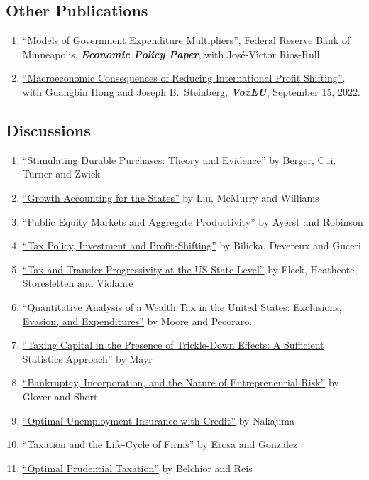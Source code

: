\documentclass[letterpaper]{article}
\begin{document}
\subsection*{Other Publications}
\begin{enumerate}[resume]
\item \href{https://www.minneapolisfed.org/~/media/files/pubs/eppapers/12-2/eppaper12-2_models.pdf}{``Models of Government Expenditure Multipliers''}, Federal Reserve Bank of Minneapolis, \textbf{\emph{Economic Policy Paper}}, with Jos\'e-V\'{\i}ctor R\'{\i}os-Rull.
\item \href{https://cepr.org/voxeu/columns/macroeconomic-consequences-reducing-international-profit-shifting}{``Macroeconomic Consequences of Reducing International Profit Shifting''}, with Guangbin Hong and Joseph B.\ Steinberg, \textbf{\emph{VoxEU}}, September 15, 2022.
\end{enumerate}

\subsection*{Discussions}
\begin{enumerate}
\item \href{https://www.dyrda.info/files/NTA_discussion_Dyrda.pdf}{``Stimulating Durable Purchases: Theory and Evidence''} by Berger, Cui, Turner and Zwick
\item \href{https://dyrda.info/files/Dyrda_VMC_discussion.pdf}{``Growth Accounting for the States''} by Liu, McMurry and Williams
\item \href{https://dyrda.info/files/CMSG23_discussion.pdf}{``Public Equity Markets and Aggregate Productivity''} by Ayerst and Robinson
\item \href{https://dyrda.info/files/Bilicka_Devereux_Guceri_IIPF2023_discussion.pdf}{``Tax Policy, Investment and Profit-Shifting''} by Bilicka, Devereux and Guceri
\item \href{https://dyrda.info/files/NTA_discussion_FHSV.pdf}{``Tax and Transfer Progressivity at the US State Level''} by Fleck, Heathcote, Storesletten and Violante
\item \href{https://dyrda.info/files/NTA_discussion_MP.pdf}{``Quantitative Analysis of a Wealth Tax in the United States: Exclusions, Evasion, and Expenditures''} by Moore and Pecoraro.
\item \href{https://dyrda.info/files/Discussion_Mayr.pdf}{``Taxing Capital in the Presence of Trickle-Down Effects: A Sufficient Statistics Approach''} by Mayr
\item \href{https://dyrda.info/files/Discussion_Dyrda_CMSG2019.pdf}{``Bankruptcy, Incorporation, and the Nature of Entrepreneurial Risk''} by Glover and Short
\item \href{https://dyrda.info/files/Discussion_UPenn_040619.pdf}{``Optimal Unemployment Insurance with Credit''} by Nakajima
\item \href{https://dyrda.info/files/Discussion_Dyrda_CRNY_111018.pdf}{``Taxation and the Life-Cycle of Firms''} by Erosa and Gonzalez
\item \href{https://dyrda.info/files/Discussion_Dyrda_071318.pdf}{``Optimal Prudential Taxation''} by Belchior and Reis
\end{enumerate}
\end{document}
